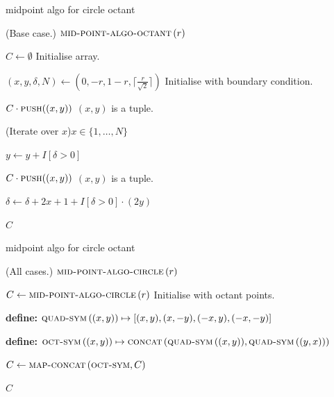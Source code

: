 \documentclass[aspectratio=169,xcolor={dvipsnames,svgnames}]{beamer}
\begin{document}
\begin{frame}[label={sec:org8032ea1}]{midpoint algo for circle octant}
\begin{algorithm}[H]
  \caption{Mid-Point Algorithm for Circle Octant}
  \DontPrintSemicolon

  \Fn(\hfill {\scriptsize Base case.}){\upshape
    $\textsc{mid-point-algo-octant}\, (r)$}{


    $C\gets\emptyset$ \hfill {\scriptsize Initialise
      array.}

    $(x,y,\delta,N) \gets (0, -r, 1-r, \lceil
    \frac{r}{\sqrt{2}} \rceil)$ \hfill {\scriptsize
      Initialise with boundary condition.}

    $C\cdot\textsc{push}((x,y))$\hfill {\scriptsize
      $(x,y)$ is a tuple.}

    \For(\hfill{\scriptsize Iterate over
      $x$}){$x\in\{1,\ldots,N\}$}{

      $y\gets y+I[\delta>0]$

      $C\cdot\textsc{push}((x,y))$\hfill {\scriptsize
        $(x,y)$ is a tuple.}

      $\delta \gets \delta + 2x + 1 +
      I[\delta>0]\cdot(2y)$

    }

    \Return $C$

  }
\end{algorithm}
\end{frame}

\begin{frame}[label={sec:orgccddf7c}]{midpoint algo for circle octant}
\begin{algorithm}[H]
  \caption{Mid-Point Algorithm for Circle}
  \DontPrintSemicolon

  \Fn(\hfill {\scriptsize All cases.}){\upshape
    $\textsc{mid-point-algo-circle}\, (r)$}{


    $C\gets\textsc{mid-point-algo-circle}\, (r)$ \hfill
    {\scriptsize Initialise with octant points.}

    \textbf{define:} $\textsc{quad-sym}\,((x,y))
    \mapsto [(x,y),(x,-y),(-x,y),(-x,-y)]$

    \textbf{define:}
    $\textsc{oct-sym}\,((x,y)) \mapsto
    \textsc{concat}\, (\textsc{quad-sym}\,((x,y)),
    \textsc{quad-sym}\,((y,x)))$

    $C\gets \textsc{map-concat}\,(\textsc{oct-sym}, C)$

    \Return $C$

  }
\end{algorithm}
\end{frame}
\end{document}
